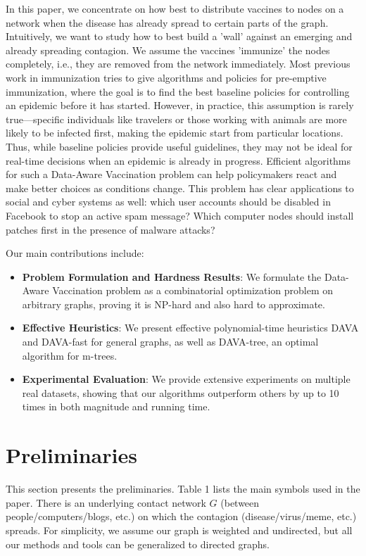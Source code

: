 \documentclass{article}
\begin{document}
In this paper, we concentrate on how best to distribute vaccines to nodes on a network when the disease has already spread to certain parts of the graph. Intuitively, we want to study how to best build a 'wall' against an emerging and already spreading contagion. We assume the vaccines 'immunize' the nodes completely, i.e., they are removed from the network immediately. Most previous work in immunization tries to give algorithms and policies for pre-emptive immunization, where the goal is to find the best baseline policies for controlling an epidemic before it has started. However, in practice, this assumption is rarely true—specific individuals like travelers or those working with animals are more likely to be infected first, making the epidemic start from particular locations. Thus, while baseline policies provide useful guidelines, they may not be ideal for real-time decisions when an epidemic is already in progress. Efficient algorithms for such a Data-Aware Vaccination problem can help policymakers react and make better choices as conditions change. This problem has clear applications to social and cyber systems as well: which user accounts should be disabled in Facebook to stop an active spam message? Which computer nodes should install patches first in the presence of malware attacks?

Our main contributions include:
\begin{itemize}
    \item \textbf{Problem Formulation and Hardness Results}: We formulate the Data-Aware Vaccination problem as a combinatorial optimization problem on arbitrary graphs, proving it is NP-hard and also hard to approximate.
    \item \textbf{Effective Heuristics}: We present effective polynomial-time heuristics DAVA and DAVA-fast for general graphs, as well as DAVA-tree, an optimal algorithm for m-trees.
    \item \textbf{Experimental Evaluation}: We provide extensive experiments on multiple real datasets, showing that our algorithms outperform others by up to 10 times in both magnitude and running time.
\end{itemize}

\section{Preliminaries}

This section presents the preliminaries. Table 1 lists the main symbols used in the paper. There is an underlying contact network $G$ (between people/computers/blogs, etc.) on which the contagion (disease/virus/meme, etc.) spreads. For simplicity, we assume our graph is weighted and undirected, but all our methods and tools can be generalized to directed graphs.
\end{document}
